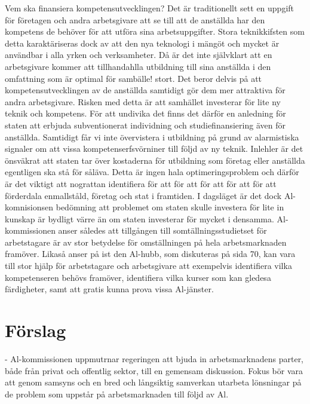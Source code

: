 {Vem ska finansiera kompetensutvecklingen? Det är traditionellt sett en uppgift för företagen och andra arbetsgivare att se till att de anställda har den kompetens de behöver för att utföra sina arbetsuppgifter. Stora teknikkifsten som detta karaktäriseras dock av att den nya teknologi i mängöt och mycket är användbar i alla yrken och verksamheter. Då är det inte självklart att en arbetsgivare kommer att tillhandahlla utbildning till sina anställda i den omfattning som är optimal för sambälle! stort. Det beror delvis på att kompetensutvecklingen av de anställda samtidigt gör dem mer attraktiva för andra arbetsgivare.
Risken med detta är att samhället investerar för lite ny teknik och kompetens. För att undivika det finns det därför en anledning för staten att erbjuda subventionerat individning och studiefinansiering även för anställda. Samtidigt får vi inte övervistera i utbildning på grund av alarmistiska signaler om att vissa kompetenserfsvörniner till följd av ny teknik. Inlehler är det önsväkrat att staten tar över kostaderna för utbildning som företag eller anställda egentligen ska stå för såläva. Detta är ingen hala optimeringsproblem och därför är det viktigt att nograttan identifiera för att för att för att för att för att förderdala enmallståld, företag och stat i framtiden.
I dagsläget är det dock Al-komnisionsen bedömning att problemet om staten skulle investera för lite in kunskap är bydligt värre än om staten investerar för mycket i densamma. Al-kommissionen anser således att tillgången till somtällningsstudietset för arbetstagare är av stor betydelse för omställningen på hela arbetsmarknaden framöver. Likaså anser på ist den Al-hubb, som diskuteras på sida 70, kan vara till stor hjälp för arbetstagare och arbetsgivare att exempelvis identifiera vilka kompetenseren behövs framöver, identifiera vilka kurser som kan gledesa färdigheter, samt att gratis kunna prova vissa Al-jänster.
\section*{Förslag}
- Al-kommissionen uppmutrnar regeringen att bjuda in arbetsmarknadens parter, både från privat och offentlig sektor, till en gemensam diskussion. Fokus bör vara att genom samsyns och en bred och långsiktig samverkan utarbeta lönsningar på de problem som uppstår på arbetsmarknaden till följd av Al.

}
